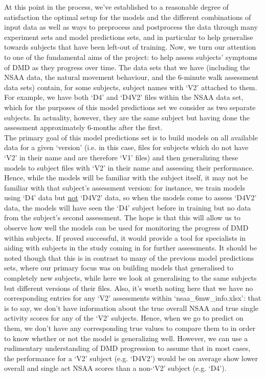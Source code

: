 \documentclass[12pt,twoside]{report}
\begin{document}
\quad At this point in the process, we’ve established to a reasonable degree of satisfaction the optimal setup for the models and the different combinations of input data as well as ways to preprocess and postprocess the data through many experiment sets and model predictions sets, and in particular to help generalise towards subjects that have been left-out of training. Now, we turn our attention to one of the fundamental aims of the project: to help assess subjects’ symptoms of DMD as they progress over time. The data sets that we have (including the NSAA data, the natural movement behaviour, and the 6-minute walk assessment data sets) contain, for some subjects, subject names with ‘V2’ attached to them. For example, we have both ‘D4’ and ‘D4V2’ files within the NSAA data set, which for the purposes of this model predictions set we consider as two separate subjects. In actuality, however, they are the same subject but having done the assessment approximately 6-months after the first.\\

\quad The primary goal of this model predictions set is to build models on all available data for a given ‘version’ (i.e. in this case, files for subjects which do not have ‘V2’ in their name and are therefore ‘V1’ files) and then generalizing these models to subject files with ‘V2’ in their name and assessing their performance. Hence, while the models will be familiar with the subject itself, it may not be familiar with that subject’s assessment version: for instance, we train models using ‘D4’ data but \underline{not} ‘D4V2’ data, so when the models come to assess ‘D4V2’ data, the models will have seen the ‘D4’ subject before in training but no data from the subject’s second assessment. The hope is that this will allow us to observe how well the models can be used for monitoring the progress of DMD within subjects. If proved successful, it would provide a tool for specialists in aiding with subjects in the study coming in for further assessments. It should be noted though that this is in contrast to many of the previous model predictions sets, where our primary focus was on building models that generalised to completely new subjects, while here we look at generalising to the same subjects but different versions of their files. Also, it’s worth noting here that we have no corresponding entries for any ‘V2’ assessments within ‘nsaa\_6mw\_info.xlsx’: that is to say, we don’t have information about the true overall NSAA and true single activity scores for any of the ‘V2’ subjects. Hence, when we go to predict on them, we don’t have any corresponding true values to compare them to in order to know whether or not the model is generalizing well. However, we can use a rudimentary understanding of DMD progression to assume that in most cases, the performance for a ‘V2’ subject (e.g. ‘D4V2’) would be on average show lower overall and single act NSAA scores than a non-‘V2’ subject (e.g. ‘D4’).\\
\end{document}
